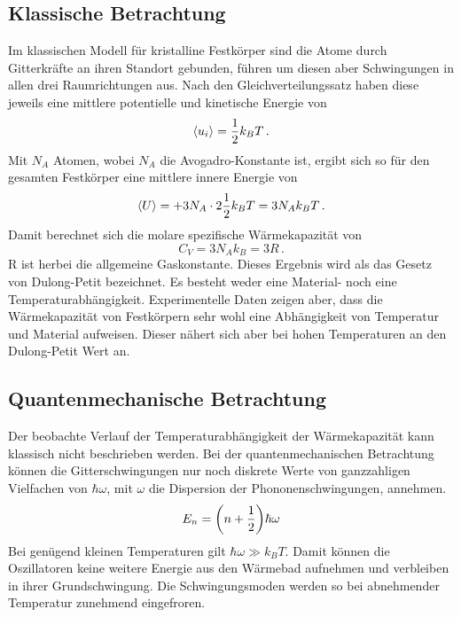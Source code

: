 \subsection{Klassische Betrachtung}

Im klassischen Modell für kristalline Festkörper sind die Atome durch Gitterkräfte an ihren Standort gebunden, führen um diesen aber Schwingungen in allen drei Raumrichtungen  aus. Nach den Gleichverteilungssatz haben diese jeweils eine mittlere potentielle und kinetische Energie von
\begin{equation}
	\expval{u_i} = \frac{1}{2}k_B T \,.
\end{equation}
Mit $N_A$ Atomen, wobei $N_A$ die Avogadro-Konstante ist, ergibt sich so für den gesamten Festkörper eine mittlere innere Energie von
\begin{equation}
	\expval{U} = + 3N_A \cdot 2 \frac{1}{2} k_B T =  3 N_A k_B T \,.
\end{equation}
Damit berechnet sich die molare spezifische Wärmekapazität von
\begin{equation}
	C_V = 3 N_A k_B = 3 R \,.
	\label{eq:D-P}
\end{equation}
R ist herbei die allgemeine Gaskonstante. Dieses Ergebnis wird als das Gesetz von Dulong-Petit bezeichnet.
Es besteht weder eine Material- noch eine Temperaturabhängigkeit. Experimentelle Daten zeigen aber,  dass die Wärmekapazität von Festkörpern sehr wohl eine Abhängigkeit von Temperatur und Material aufweisen. Dieser nähert sich aber bei hohen Temperaturen an den Dulong-Petit Wert an. 

\subsection{Quantenmechanische Betrachtung}

Der beobachte Verlauf der Temperaturabhängigkeit der Wärmekapazität kann klassisch nicht beschrieben werden. Bei der quantenmechanischen Betrachtung können die Gitterschwingungen nur noch diskrete Werte von ganzzahligen Vielfachen von $\hbar \omega$, mit $\omega$ die Dispersion der Phononenschwingungen, annehmen. 
\begin{equation}
	E_n = \qty(n + \frac{1}{2})\hbar \omega
\end{equation}
Bei genügend kleinen Temperaturen gilt $\hbar \omega \gg k_B T$. Damit können die Oszillatoren keine weitere Energie aus den Wärmebad aufnehmen und verbleiben in ihrer Grundschwingung. Die Schwingungsmoden werden so bei abnehmender Temperatur zunehmend eingefroren.

